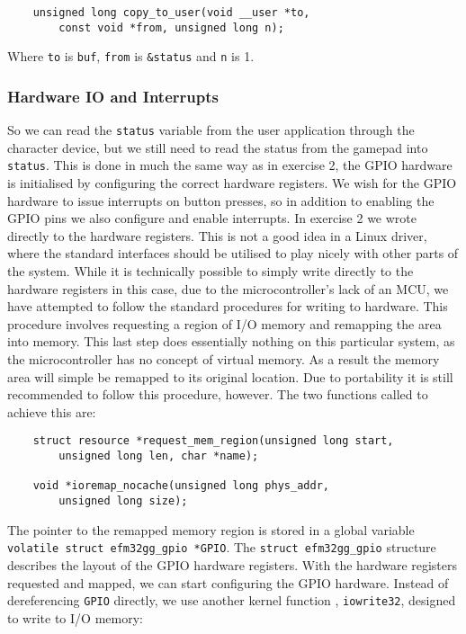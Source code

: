\begin{lstlisting}
	unsigned long copy_to_user(void __user *to,
	 	const void *from, unsigned long n);
\end{lstlisting}

Where \texttt{to} is \texttt{buf}, \texttt{from} is \texttt{\&status} and
\texttt{n} is 1.

\subsubsection{Hardware IO and Interrupts}

So we can read the \texttt{status} variable from the user application through
the character device, but we still need to read the status from the gamepad into
\texttt{status}. This is done in much the same way as in exercise 2, the GPIO
hardware is initialised by configuring the correct hardware registers. We wish
for the GPIO hardware to issue interrupts on button presses, so in addition to
enabling the GPIO pins we also configure and enable interrupts. In exercise 2 we
wrote directly to the hardware registers. This is not a good idea in a Linux
driver, where the standard interfaces should be utilised to play nicely with
other parts of the system. While it is technically possible to simply write
directly to the hardware registers in this case, due to the microcontroller's
lack of an MCU, we have attempted to follow the standard procedures for writing
to hardware. This procedure involves requesting a region of I/O memory and
remapping the area into memory. This last step does essentially nothing on this
particular system, as the microcontroller has no concept of virtual memory. As a
result the memory area will simple be remapped to its original location. Due to
portability it is still recommended to follow this procedure, however. The two
functions called to achieve this are:

\begin{lstlisting}
	struct resource *request_mem_region(unsigned long start,
		unsigned long len, char *name);

	void *ioremap_nocache(unsigned long phys_addr,
		unsigned long size);
\end{lstlisting}

The pointer to the remapped memory region is stored in a global variable
\texttt{volatile struct efm32gg\_gpio *GPIO}. The \texttt{struct efm32gg\_gpio}
structure describes the layout of the GPIO hardware registers. With the hardware
registers requested and mapped, we can start configuring the GPIO hardware.
Instead of dereferencing \texttt{GPIO} directly, we use another kernel function
, \texttt{iowrite32}, designed to write to I/O memory:

